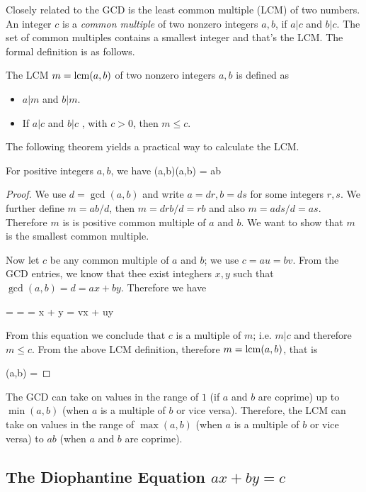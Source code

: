 Closely related to the GCD is the least common multiple (LCM) of two numbers. An integer $c$ is a \emph{common multiple} of two nonzero integers $a, b$, if $a | c$ and $b | c$. The set of common multiples contains a smallest integer and that's the LCM. The formal definition is as follows.

The LCM $m = \operatorname{lcm}(a,b)$ of two nonzero integers $a, b$ is defined as
\begin{itemize}
\item $a|m$ and $b|m$.
\item If $a|c$ and $b|c$ , with $c > 0$, then $m \leq c$.
\end{itemize}

The following theorem yields a practical way to calculate the LCM.

\begin{theorem}
  For positive integers $a, b$, we have
  \bee
  \gcd(a,b)\lcm(a,b) = ab
  \eee
\end{theorem}

\begin{proof}
  We use $d = \gcd(a,b)$ and write $a = dr, b = ds$ for some integers $r,s$. We further define $m = ab / d$, then $m = dr b / d = rb$ and also $m = a ds / d = as$. Therefore $m$ is is positive common multiple of $a$ and $b$. We want to show that $m$ is the smallest common multiple.

  Now let $c$ be any common multiple of $a$ and $b$; we use $c = au = bv$. From the GCD entries, we know that thee exist integhers $x, y$ such that $\gcd(a,b) = d = ax + by$. Therefore we have

  \bee
   =  =  = x + y = vx + uy
  \eee

  From this equation we conclude that $c$ is a multiple of $m$; i.e. $m | c$ and therefore $m \leq c$. From the above LCM definition, therefore $m = \operatorname{lcm}(a,b)$, that is

  \bee
  \lcm(a,b) = 
  \eee
\end{proof}

The GCD can take on values in the range of $1$ (if $a$ and $b$ are coprime) up to $\min(a,b)$ (when $a$ is a multiple of $b$ or vice versa). Therefore, the LCM can take on values in the range of $\max(a,b)$ (when $a$ is a multiple of $b$ or vice versa) to $ab$ (when $a$ and $b$ are coprime).

\subsection{The Diophantine Equation $ax + by = c$}




